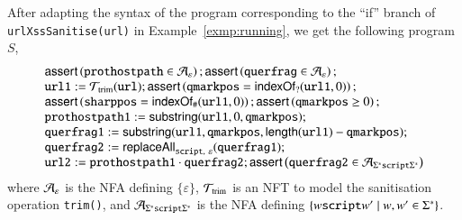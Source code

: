 \begin{example}\label{exmp:logic}
After adapting the syntax of the program corresponding to the ``if'' branch of {\tt urlXssSanitise(url)} in Example~\ref{exmp:running}, we get the following {\slint} program $S$,
\[ 
\begin{array}{l}
    \ASSERT{\mathtt{prothostpath} \in \NFA_\varepsilon}; \ASSERT{\mathtt{querfrag} \in \NFA_\varepsilon};\\
    \mathtt{url1} := \NFT_{\rm trim}(\mathtt{url}); \ASSERT{\mathtt{qmarkpos} = \indexof_?(\mathtt{url1},0)};\\
    \ASSERT{\mathtt{sharppos} = \indexof_{\#}(\mathtt{url1}, 0)}; \ASSERT{\mathtt{qmarkpos} \ge 0};\\ 
    \mathtt{prothostpath1} := \substring(\mathtt{url1}, 0, \mathtt{qmarkpos});\\
   \mathtt{querfrag1} := \substring(\mathtt{url1, qmarkpos}, \length(\mathtt{url1}) - \mathtt{qmarkpos});\\
    \mathtt{querfrag2} := \replaceall_{\mathtt{script},\ \varepsilon}(\mathtt{querfrag1});\\
    \mathtt{url2} := \mathtt{prothostpath1} \concat \mathtt{querfrag2};\ASSERT{\mathtt{querfrag2} \in \NFA_{\Sigma^*\mathtt{script}\Sigma^*}}
\end{array}
\]
where $\mathcal{A}_\varepsilon$ is the NFA defining $\{\varepsilon\}$, $\mathcal{T}_{\rm trim}$ is an NFT to model the sanitisation operation {\tt trim()}, and $ \mathcal{A}_{\Sigma^*\mathtt{script}\Sigma^*}$ is the NFA defining $\{w\mbox{\tt script} w' \mid w, w' \in \Sigma^*\}$. 
%
%
\end{example}


